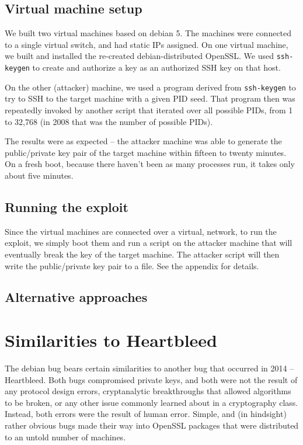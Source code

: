 \documentclass[conference]{IEEEtran}
\begin{document}
\subsection{Virtual machine setup}
We built two virtual machines based on debian 5. The machines were
connected to a single virtual switch, and had static IPs assigned. On
one virtual machine, we built and installed the re-created
debian-distributed OpenSSL. We used \verb|ssh-keygen| to create and
authorize a key as an authorized SSH key on that host.

On the other (attacker) machine, we used a program derived from
\verb|ssh-keygen| to try to SSH to the target machine with a given PID
seed. That program then was repeatedly invoked by another script that
iterated over all possible PIDs, from 1 to 32,768 (in 2008 that was
the number of possible PIDs).

The results were as expected -- the attacker machine was able to
generate the public/private key pair of the target machine within
fifteen to twenty minutes. On a fresh boot, because there haven't been
as many processes run, it takes only about five minutes.

\subsection{Running the exploit}
Since the virtual machines are connected over a virtual, network, to run the
exploit, we simply boot them and run a script on the attacker machine
that will eventually break the key of the target machine. The attacker
script will then write the public/private key pair to a file. See the
appendix for details.

\subsection{Alternative approaches}

\section{Similarities to Heartbleed}
The debian bug bears certain similarities to another bug that occurred
in 2014 -- Heartbleed\cite{4}. Both bugs compromised private keys, and
both were not the result of any protocol design errors, cryptanalytic
breakthroughs that allowed algorithms to be broken, or any other issue
commonly learned about in a cryptography class. Instead, both errors
were the result of human error. Simple, and (in hindsight) rather
obvious bugs made their way into OpenSSL packages that were
distributed to an untold number of machines.
\end{document}
